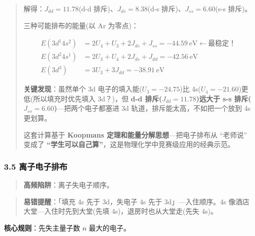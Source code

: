 \documentclass[a4paper,11pt]{ctexart}
\newcommand{\箭}{\ensuremath{\rightarrow}}
\newcommand{\左箭}{\ensuremath{\leftarrow}}
\newcommand{\上箭}{\ensuremath{\uparrow}}
\newcommand{\下箭}{\ensuremath{\downarrow}}
\newcommand{\衡}{\ensuremath{\rightleftharpoons}}
\newcommand{\双箭}{\ensuremath{\leftrightarrow}}
\newcommand{\约等于}{\ensuremath{\approx}}
\newcommand{\小于等于}{\ensuremath{\leq}}
\newcommand{\大于等于}{\ensuremath{\geq}}
\newcommand{\不等于}{\ensuremath{\neq}}
\newcommand{\西格马}{\ensuremath{\sigma}}
\newcommand{\派}{\ensuremath{\pi}}
\begin{document}
\begin{quote}
解得：\(J_{dd} = 11.78\)(d-d 排斥)、\(J_{ds} = 8.38\)(d-s 排斥)、\(J_{ss} = 6.60\)(s-s 排斥)。

三种可能排布的能量(以 Ar 为零点)：

\[\begin{aligned}
E(3d^1 4s^2) &= 2U_4 + U_3 + 2J_{ds} + J_{ss} = -44.59\ \mathrm{eV} \leftarrow \text{最稳定！}\\
E(3d^2 4s^1) &= 2U_3 + U_4 + 2J_{ds} + J_{dd} = -42.56\ \mathrm{eV}\\
E(3d^3)      &= 3U_3 + 3J_{dd} = -38.91\ \mathrm{eV}
\end{aligned}\]

\textbf{关键发现}：虽然单个 3d 电子的填入能(\(U_3 = -24.75\))比 4s(\(U_4 = -21.60\))更低(所以填充时优先填入 3d？)，但 \textbf{d-d 排斥(\(J_{dd} = 11.78\))远大于 s-s 排斥(\(J_{ss} = 6.60\))}---把两个电子都塞进 3d 轨道，排斥能太高，不如把一个放到 4s 更划算。

这套计算基于 \textbf{Koopmans 定理和能量分解思想}---把电子排布从 ``老师说'' 变成了 \textbf{``学生可以自己算''}，这是物理化学中竞赛级应用的经典示范。
\end{quote}

\subsubsection{3.5 离子电子排布}\label{ux79bbux5b50ux7535ux5b50ux6392ux5e03}

\begin{quote}
\textbf{高频陷阱}：离子失电子顺序。
\end{quote}

\begin{quote}
\textbf{易错提醒}：「填充 4s 先于 3d，失电子 4s 先于 3d」---入住顺序。4s 像酒店大堂---入住时先到大堂(先填 4s)，退房时也从大堂走(先失 4s)。
\end{quote}

\textbf{核心规则}：先失主量子数 \(n\) 最大的电子。
\end{document}
